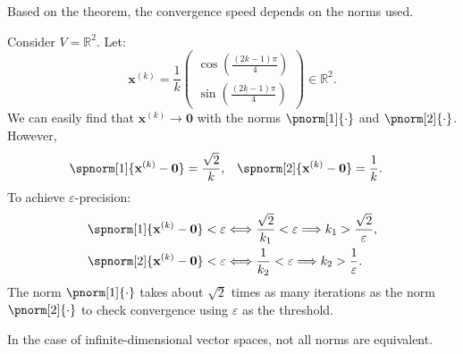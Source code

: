 \documentclass{huhtakm-template-book-v2}
\begin{document}
    \begin{rem}
        Based on the theorem, the convergence speed depends on the norms used.
    \end{rem}
    \begin{eg}
        Consider $V = \mathbb{R}^{2}$. Let:
        \begin{equation*}
            \mathbf{x}^{(k)} = \frac{1}{k}\begin{pmatrix}
                \cos\left(\frac{(2k-1)\pi}{4}\right)\\
                \sin\left(\frac{(2k-1)\pi}{4}\right)
            \end{pmatrix} \in \mathbb{R}^{2}.
        \end{equation*}
        We can easily find that $\mathbf{x}^{(k)} \to \mathbf{0}$ with the norms $\pnorm[1]{\cdot}$ and $\pnorm[2]{\cdot}$. However,
        \begin{align*}
            \spnorm[1]{\mathbf{x}^{(k)} - \mathbf{0}} &= \frac{\sqrt{2}}{k}, & \spnorm[2]{\mathbf{x}^{(k)} - \mathbf{0}} &= \frac{1}{k}.
        \end{align*}
        To achieve $\varepsilon$-precision:
        \begin{align*}
            \spnorm[1]{\mathbf{x}^{(k)} - \mathbf{0}} < \varepsilon &\Longleftrightarrow \frac{\sqrt{2}}{k_{1}} < \varepsilon \Longrightarrow k_{1} > \frac{\sqrt{2}}{\varepsilon},\\
            \spnorm[2]{\mathbf{x}^{(k)} - \mathbf{0}} < \varepsilon &\Longleftrightarrow \frac{1}{k_{2}} < \varepsilon \Longrightarrow k_{2} > \frac{1}{\varepsilon}.
        \end{align*}
        The norm $\pnorm[1]{\cdot}$ takes about $\sqrt{2}$ times as many iterations as the norm $\pnorm[2]{\cdot}$ to check convergence using $\varepsilon$ as the threshold.
    \end{eg}
    \begin{rem}
        In the case of infinite-dimensional vector spaces, not all norms are equivalent.
    \end{rem}
\end{document}
